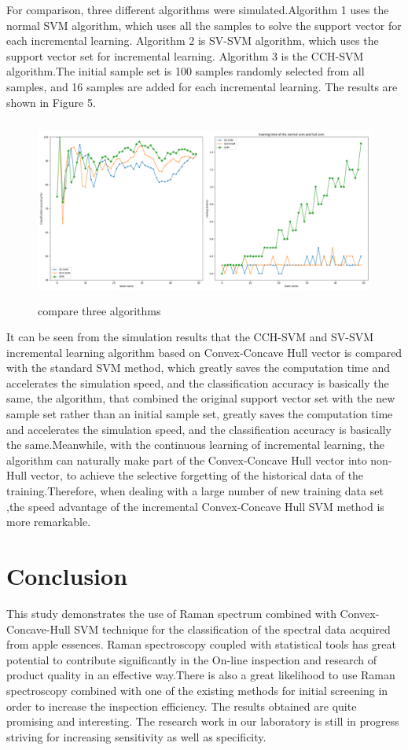 \documentclass[a4paper]{article}
\begin{document}
For comparison, three different algorithms were simulated.Algorithm 1 uses the normal SVM algorithm, which uses all the samples to solve the support vector for each incremental learning. Algorithm 2 is SV-SVM algorithm, which uses the support vector set for incremental learning. Algorithm 3 is the CCH-SVM algorithm.The initial sample set is 100 samples randomly selected from all samples, and 16 samples are added for each incremental learning. The results are shown in Figure 5.

\begin{figure}[h]
  \centering
  \includegraphics[width=15cm,height=6cm]{Figure_2}
  \caption{compare three algorithms}
\end{figure}

It can be seen from the simulation results that the CCH-SVM and SV-SVM incremental learning algorithm based on Convex-Concave Hull vector is compared with the standard SVM method, which greatly saves the computation time and accelerates the simulation speed, and the classification accuracy is basically the same, the algorithm, that combined the original support vector set with the new sample set rather than an initial sample set, greatly saves the computation time and accelerates the simulation speed, and the classification accuracy is basically the same.Meanwhile, with the continuous learning of incremental learning, the algorithm can naturally make part of the Convex-Concave Hull vector into non-Hull vector, to achieve the selective forgetting of the historical data of the training.Therefore, when dealing with a large number of new training data set ,the speed advantage of the incremental Convex-Concave Hull SVM method is more remarkable.

\section{Conclusion}
This  study  demonstrates  the  use  of  Raman  spectrum  combined  with Convex-Concave-Hull SVM  technique  for the  classification  of  the  spectral  data  acquired  from  apple essences. Raman  spectroscopy  coupled  with  statistical  tools  has  great  potential  to  contribute significantly in the On-line inspection and research of product quality in an effective way.There is also a great  likelihood  to  use  Raman  spectroscopy  combined  with  one  of  the  existing  methods  for initial screening in order to increase the inspection efficiency. The results obtained are quite promising and interesting. The research work in our laboratory is still in progress striving for increasing sensitivity as well as specificity.
\end{document}

